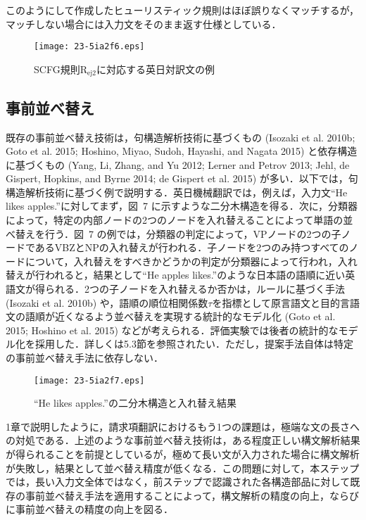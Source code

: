 \documentclass[japanese]{jnlp_1.4}
\begin{document}
このようにして作成したヒューリスティック規則はほぼ誤りなくマッチするが，マッチしない場合には入力文をそのまま返す仕様としている．

\begin{figure}[t]
\begin{center}
\texttt{[image: 23-5ia2f6.eps]}
\end{center}
\caption{SCFG規則R$_{\mathrm{ej2}}$に対応する英日対訳文の例}
\label{fig06}
\end{figure}


\subsection{事前並べ替え}

既存の事前並べ替え技術は，句構造解析技術に基づくもの (Isozaki et al. 2010b; 
Goto et al. 2015; Hoshino, Miyao, Sudoh, Hayashi, and Nagata 
2015) と依存構造に基づくもの (Yang, Li, Zhang, and Yu 2012; Lerner and 
Petrov 2013; Jehl, de Gispert, Hopkins, and Byrne 2014; de Gispert et al. 
2015) が多い．以下では，句構造解析技術に基づく例で説明する．英日機械翻訳では，例えば，入力文``He 
likes apples.''に対してまず，図~7 に示すような二分木構造を得る．次に，分類器によって，特定の内部ノードの2つのノードを入れ替えることによって単語の並べ替えを行う．図~7 の例では，分類器の判定によって，VPノードの2つの子ノードであるVBZとNPの入れ替えが行われる．子ノードを2つのみ持つすべてのノードについて，入れ替えをすべきかどうかの判定が分類器によって行われ，入れ替えが行われると，結果として``He 
apples 
likes.''のような日本語の語順に近い英語文が得られる．2つの子ノードを入れ替えるか否かは，ルールに基づく手法 (Isozaki 
et al. 2010b) や，語順の順位相関係数$\tau 
$を指標として原言語文と目的言語文の語順が近くなるよう並べ替えを実現する統計的なモデル化 (Goto 
et al. 2015; Hoshino et al. 
2015) などが考えられる．評価実験では後者の統計的なモデル化を採用した．詳しくは5.3節を参照されたい．ただし，提案手法自体は特定の事前並べ替え手法に依存しない．

\begin{figure}[t]
\begin{center}
\texttt{[image: 23-5ia2f7.eps]}
\end{center}
\caption{``He likes apples.''の二分木構造と入れ替え結果}
\label{fig07}
\end{figure}

1章で説明したように，請求項翻訳におけるもう1つの課題は，極端な文の長さへの対処である．上述のような事前並べ替え技術は，ある程度正しい構文解析結果が得られることを前提としているが，極めて長い文が入力された場合に構文解析が失敗し，結果として並べ替え精度が低くなる．この問題に対して，本ステップでは，長い入力文全体ではなく，前ステップで認識された各構造部品に対して既存の事前並べ替え手法を適用することによって，構文解析の精度の向上，ならびに事前並べ替えの精度の向上を図る．
\end{document}
